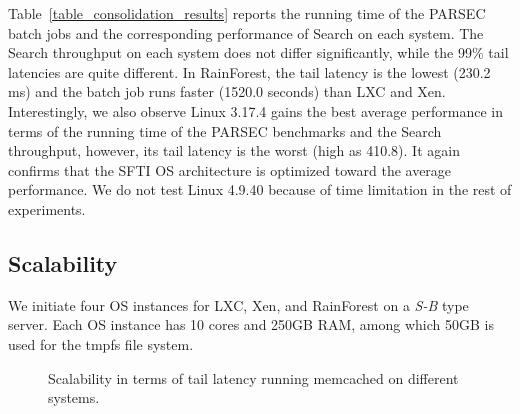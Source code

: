 \documentclass[pageno]{jpaper}
\begin{document}
Table~\ref{table_consolidation_results} reports the running time of the PARSEC batch jobs and the corresponding performance of Search on each system. The Search throughput on each system  does not differ significantly, while the 99\% tail latencies are quite different. In RainForest, the tail latency is the lowest (230.2 ms) and the batch job runs faster (1520.0 seconds) than LXC and Xen. Interestingly, we also observe Linux 3.17.4 gains the best average performance in terms of the running time of the PARSEC benchmarks and the Search throughput, however, its tail latency is the worst (high as 410.8). It again confirms that the SFTI OS architecture is optimized toward the average performance. We do not test Linux 4.9.40 because of time limitation in the rest of experiments.





















\subsection{Scalability}
We initiate  four OS instances for LXC, Xen, and RainForest on a \emph{S-B} type server. Each OS instance has 10 cores and 250GB RAM, among which 50GB is used for the tmpfs file system.



















\begin{figure}[t]
\setlength{\abovecaptionskip}{3pt}
\setlength{\belowcaptionskip}{0pt}
  \centering
    \caption{Scalability in terms of tail latency running memcached on different systems.} \label{fig_scalability.5885.memcached}
\end{figure}
\end{document}
